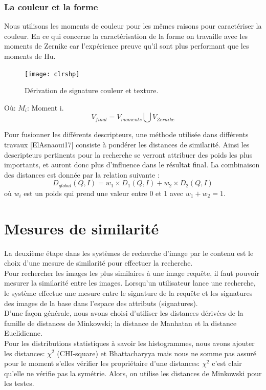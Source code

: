\subsubsection{La couleur et la forme}
Nous utilisons les moments de couleur pour les mêmes raisons pour caractériser la couleur. En ce qui concerne la caractérisation de la forme on travaille avec les moments de Zernike car l'expérience preuve qu'il sont plus performant que les moments de Hu.
\begin{figure}[H]
	\centering
	\texttt{[image: clrshp]}
	\caption{Dérivation de signature couleur et texture.}
\end{figure}
Où: 
$ M_i $: Moment i.
\begin{equation}
V_{final} = V_{moments} \bigcup V_{Zernike}
\end{equation}

Pour fusionner les différents descripteurs, une méthode utilisée dans différents travaux [ElAsnaoui17] consiste à pondérer les distances de similarité. Ainsi les descripteurs pertinents pour la recherche se verront attribuer des poids les plus importants, et auront donc plus d’influence dans le résultat final. La combinaison des distances est donnée par la relation suivante :
\begin{equation}
	D_{global}(Q, I) = w_1 \times 	D_{1}(Q, I) + w_2 \times 	D_{2}(Q, I)
\end{equation}
où $ w_i $ est un poids qui prend une valeur entre 0 et 1 avec $ w_1+w_2= 1 $.
\section{Mesures de similarité}
La deuxième étape dans les systèmes de recherche d'image par le contenu est le choix d'une mesure de similarité pour effectuer la recherche.\\

Pour rechercher les images les plus similaires à une image requête, il faut pouvoir mesurer la similarité entre les images. Lorsqu’un utilisateur lance une recherche, le système effectue une mesure entre le signature de la requête et les signatures des images de la base dans l’espace des attributs (signatures).\\

D'une façon générale, nous avons choisi d’utiliser les distances dérivées de la famille de distances de Minkowski; la distance de Manhatan et la distance Euclidienne.\\

Pour les distributions statistiques à savoir les histogrammes, nous avons ajouter les distances:  $\chi^2$ (CHI-square) et Bhattacharyya mais nous ne somme pas assuré pour le moment s'elles vérifier les propriétaire d'une distances: $\chi^2$ c'est clair qu'elle ne vérifie pas la symétrie. Alors, on utilise les distances de Minkowski pour les testes.

